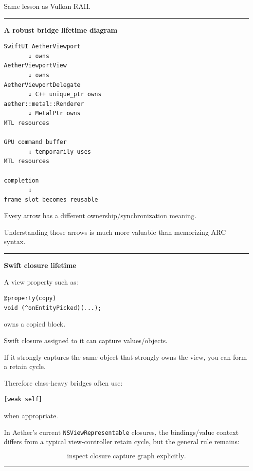 Same lesson as Vulkan RAII.

\begin{center}\rule{0.5\linewidth}{0.5pt}\end{center}

\textbf{A robust bridge lifetime diagram}

\begin{verbatim}
SwiftUI AetherViewport
       ↓ owns
AetherViewportView
       ↓ owns
AetherViewportDelegate
       ↓ C++ unique_ptr owns
aether::metal::Renderer
       ↓ MetalPtr owns
MTL resources

GPU command buffer
       ↓ temporarily uses
MTL resources

completion
       ↓
frame slot becomes reusable
\end{verbatim}

Every arrow has a different ownership/synchronization meaning.

Understanding those arrows is much more valuable than memorizing ARC syntax.

\begin{center}\rule{0.5\linewidth}{0.5pt}\end{center}

\textbf{Swift closure lifetime}

A view property such as:

\begin{verbatim}
@property(copy)
void (^onEntityPicked)(...);
\end{verbatim}

owns a copied block.

Swift closure assigned to it can capture values/objects.

If it strongly captures the same object that strongly owns the view, you can form a retain cycle.

Therefore class-heavy bridges often use:

\begin{verbatim}
[weak self]
\end{verbatim}

when appropriate.

In Aether's current \texttt{NSViewRepresentable} closures, the bindings/value context differs from a typical view-controller retain cycle, but the general rule remains:

\[
\boxed{
\text{inspect closure capture graph explicitly}.
}
\]

\begin{center}\rule{0.5\linewidth}{0.5pt}\end{center}

